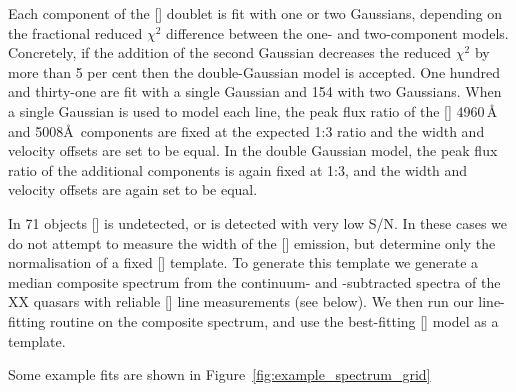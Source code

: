 Each component of the [] doublet is fit with one or two Gaussians, depending on the fractional reduced $\chi^2$ difference between the one- and two-component models. 
Concretely, if the addition of the second Gaussian decreases the reduced $\chi^2$ by more than 5 per cent then the double-Gaussian model is accepted.
One hundred and thirty-one are fit with a single Gaussian and 154 with two Gaussians. 
When a single Gaussian is used to model each line, the peak flux ratio of the [] 4960\,\AA\, and 5008\AA\, components are fixed at the expected 1:3 ratio and the width and velocity offsets are set to be equal.
In the double Gaussian model, the peak flux ratio of the additional components is again fixed at 1:3, and the width and velocity offsets are again set to be equal. 

In 71 objects [] is undetected, or is detected with very low \ac{S/N}. 
In these cases we do not attempt to measure the width of the [] emission, but determine only the normalisation of a fixed [] template.
To generate this template we generate a median composite spectrum from the continuum- and -subtracted spectra of the XX quasars with reliable [] line measurements (see below). 
We then run our line-fitting routine on the composite spectrum, and use the best-fitting [] model as a template. 

Some example fits are shown in Figure~\ref{fig:example_spectrum_grid}

